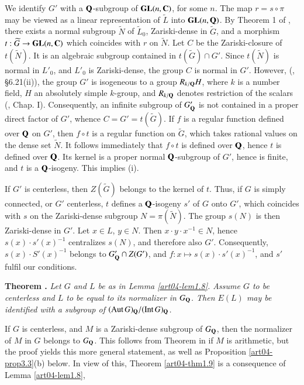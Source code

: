 We identify $G'$ with a $\mathbf{Q}$-subgroup of $\mathbf{GL}(n,\mathbf{C})$, for some $n$. The map $r=s\circ\pi$ may be viewed as a linear representation of $\widetilde{L}$ into $\mathbf{GL}(n,\mathbf{Q})$. By Theorem 1 of \cite{art04-key25}, there exists a normal subgroup $\widetilde{N}$ of $\widetilde{L}_{0}$, Zariski-dense in $\widetilde{G}$, and a morphism $t:\widetilde{G}\to \mathbf{GL}(n,\mathbf{C})$ which coincides with $r$ on $\widetilde{N}$. Let $C$ be the Zariski-closure of $t(\widetilde{N})$. It is an algebraic subgroup contained in $t(\widetilde{G})\cap G'$. Since $t(\widetilde{N})$ is normal in $L'_{0}$, and $L'_{0}$ is Zariski-dense, the group $C$ is normal in $G'$. However, (\cite{art04-key9}, \S6.21(ii)), the group $G'$ is isogeneous to a group $R_{k/\mathbf{Q}}H$, where $k$ is a number field, $H$ an absolutely simple $k$-group, and $R_{k/\mathbf{Q}}$ denotes restriction of the scalars (\cite{art04-key31}, Chap. I). Consequently, an infinite subgroup of $G'_{\mathbf{Q}}$ is not contained in a proper direct factor of $G'$, whence $C=G'=t(\widetilde{G})$. If $f$ is a regular function defined over $\mathbf{Q}$ on $G'$, then $f\circ t$ is a regular function on $\widetilde{G}$, which takes rational values on the dense set $\widetilde{N}$. It follows immediately that $f\circ t$ is defined over $\mathbf{Q}$, hence $t$ is defined over $\mathbf{Q}$. Its kernel is a proper normal $\mathbf{Q}$-subgroup of $G'$, hence is finite, and $t$ is a $\mathbf{Q}$-isogeny. This implies (i).

If $G'$ is centerless, then $Z(\widetilde{G})$ belongs to the kernel of $t$. Thus, if $G$ is simply connected, or $G'$ centerless, $t$ defines a $\mathbf{Q}$-isogeny $s'$ of $G$ onto $G'$, which coincides with $s$ on the Zariski-dense subgroup $N=\pi(\widetilde{N})$. The group $s(N)$ is then Zariski-dense in $G'$. Let $x\in L$, $y\in N$. Then $x\cdot y\cdot x^{-1}\in N$, hence $s(x)\cdot s'(x)^{-1}$ centralizes $s(N)$, and therefore also $G'$. Consequently, $s(x)\cdot S'(x)^{-1}$ belongs to $G'_{\mathbf{Q}}\cap Z(G')$, and $f:x\mapsto s(x)\cdot s'(x)^{-1}$, and $s'$ fulfil our conditions.

\medskip
\noindent
{\bf Theorem .\label{art04-thm1.9}}
{\em Let $G$ and $L$ be as in Lemma \ref{art04-lem1.8}. Assume $G$ to be centerless and $L$ to be equal to its normalizer in $G_{\mathbf{Q}}$. Then $E(L)$ may be identified with a subgroup of $(\operatorname{\mathrm{Aut}} G)_{\mathbf{Q}}/(\operatorname{\mathrm{Int}} G)_{\mathbf{Q}}$.}
\smallskip

If $G$ is centerless, and $M$ is a Zariski-dense subgroup of $G_{\mathbf{Q}}$, then the normalizer of $M$ in $G$ belongs to $G_{\mathbf{Q}}$. This follows from Theorem in \cite{art04-key6} if $M$ is arithmetic, but the proof yields this more general statement, as well as Proposition \ref{art04-prop3.3}(b) below. In view of this, Theorem \ref{art04-thm1.9} is a consequence of Lemma \ref{art04-lem1.8},

